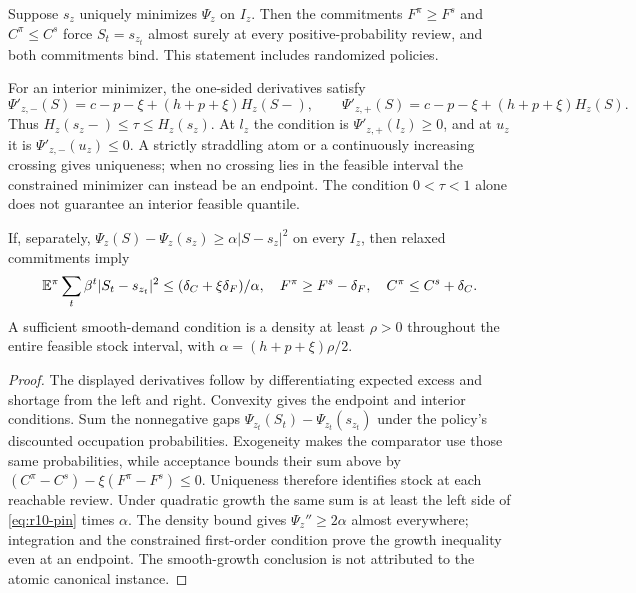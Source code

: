 \begin{proposition}\label{prop:r10-stock}
Suppose $s_z$ uniquely minimizes $\Psi_z$ on $I_z$. Then the commitments $F^\pi\geq F^s$ and $C^\pi\leq C^s$ force $S_t=s_{z_t}$ almost surely at every positive-probability review, and both commitments bind. This statement includes randomized policies.

For an interior minimizer, the one-sided derivatives satisfy
\[
 \Psi'_{z,-}(S)=c-p-\xi+(h+p+\xi)H_z(S-),\qquad
 \Psi'_{z,+}(S)=c-p-\xi+(h+p+\xi)H_z(S).
\]
Thus $H_z(s_z-)\leq\tau\leq H_z(s_z)$. At $l_z$ the condition is $\Psi'_{z,+}(l_z)\geq0$, and at $u_z$ it is $\Psi'_{z,-}(u_z)\leq0$. A strictly straddling atom or a continuously increasing crossing gives uniqueness; when no crossing lies in the feasible interval the constrained minimizer can instead be an endpoint. The condition $0<\tau<1$ alone does not guarantee an interior feasible quantile.

If, separately, $\Psi_z(S)-\Psi_z(s_z)\geq\alpha|S-s_z|^2$ on every $I_z$, then relaxed commitments imply
\begin{equation}\label{eq:r10-pin}
 \mathbb E^\pi\sum_t\beta^t|S_t-s_{z_t}|^2
 \leq(\delta_C+\xi\delta_F)/\alpha,
 \quad F^\pi\geq F^s-\delta_F,\quad C^\pi\leq C^s+\delta_C.
\end{equation}
A sufficient smooth-demand condition is a density at least $\rho>0$ throughout the entire feasible stock interval, with $\alpha=(h+p+\xi)\rho/2$.
\end{proposition}
\begin{proof}
The displayed derivatives follow by differentiating expected excess and shortage from the left and right. Convexity gives the endpoint and interior conditions. Sum the nonnegative gaps $\Psi_{z_t}(S_t)-\Psi_{z_t}(s_{z_t})$ under the policy's discounted occupation probabilities. Exogeneity makes the comparator use those same probabilities, while acceptance bounds their sum above by $(C^\pi-C^s)-\xi(F^\pi-F^s)\leq0$. Uniqueness therefore identifies stock at each reachable review. Under quadratic growth the same sum is at least the left side of \eqref{eq:r10-pin} times $\alpha$. The density bound gives $\Psi_z''\geq2\alpha$ almost everywhere; integration and the constrained first-order condition prove the growth inequality even at an endpoint. The smooth-growth conclusion is not attributed to the atomic canonical instance.
\end{proof}

